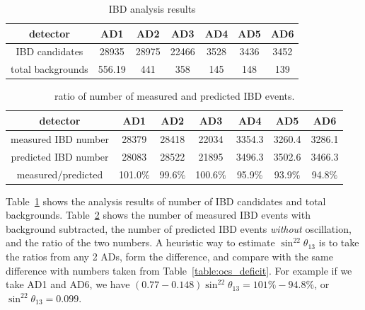 \begin{table}
	\centering
	\begin{tabular}{|c|c|c|c|c|c|c|}
		\hline
		detector & AD1 & AD2 & AD3 & AD4 & AD5 & AD6 \\
		\hline
		\hline
		IBD candidates & 28935 & 28975 & 22466 & 3528 & 3436 & 3452 \\
		\hline
		total backgrounds & 556.19 & 441 & 358 & 145 & 148 & 139 \\
		\hline
	\end{tabular}
	\caption{IBD analysis results}
	\label{table:IBD}
\end{table}

\begin{table}
	\centering
	\begin{tabular}{|c|c|c|c|c|c|c|}
	\hline
	detector & AD1 & AD2 & AD3 & AD4 & AD5 & AD6 \\
	\hline
	\hline
	measured IBD number & 28379 & 28418 & 22034 & 3354.3 & 3260.4 & 3286.1 \\
	\hline
	predicted IBD number & 28083 & 28522 & 21895 & 3496.3 & 3502.6 & 3466.3 \\
	\hline
	measured/predicted & 101.0$\%$ & 99.6$\%$ & 100.6$\%$ & 95.9$\%$ & 93.9$\%$ & 94.8$\%$ \\
	\hline
	\end{tabular}
	\caption{ratio of number of measured and predicted IBD events.}
	\label{table:IBD_ratio}
\end{table}

Table~\ref{table:IBD} shows the analysis results of number of IBD candidates and total backgrounds. Table~\ref{table:IBD_ratio} shows the number of measured IBD events with background subtracted, the number of predicted IBD events \emph{without} oscillation, and the ratio of the two numbers. A heuristic way to estimate $\sin^22\theta_{13}$ is to take the ratios from any 2 ADs, form the difference, and compare with the same difference with numbers taken from Table~\ref{table:ocs_deficit}. For example if we take AD1 and AD6, we have $(0.77-0.148)\sin^22\theta_{13}=101\%-94.8\%$, or $\sin^22\theta_{13}=0.099$.


